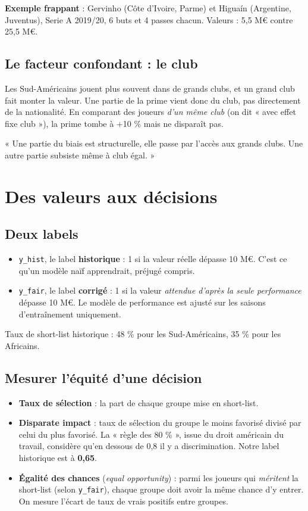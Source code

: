 \documentclass[11pt,a4paper]{article}
\begin{document}
\textbf{Exemple frappant} : Gervinho (Côte d'Ivoire, Parme) et Higuaín (Argentine, Juventus), Serie A 2019/20, 6 buts et 4 passes chacun. Valeurs : 5,5 M€ contre 25,5 M€.

\subsection{Le facteur confondant : le club}
Les Sud-Américains jouent plus souvent dans de grands clubs, et un grand club fait monter la valeur. Une partie de la prime vient donc du club, pas directement de la nationalité. En comparant des joueurs \emph{d'un même club} (on dit « avec effet fixe club »), la prime tombe à +10 \% mais ne disparaît pas.

\begin{oral}
« Une partie du biais est structurelle, elle passe par l'accès aux grands clubs. Une autre partie subsiste même à club égal. »
\end{oral}

\section{Des valeurs aux décisions}
\subsection{Deux labels}
\begin{itemize}
  \item \texttt{y\_hist}, le label \textbf{historique} : 1 si la valeur réelle dépasse 10 M€. C'est ce qu'un modèle naïf apprendrait, préjugé compris.
  \item \texttt{y\_fair}, le label \textbf{corrigé} : 1 si la valeur \emph{attendue d'après la seule performance} dépasse 10 M€. Le modèle de performance est ajusté sur les saisons d'entraînement uniquement.
\end{itemize}
Taux de short-list historique : 48 \% pour les Sud-Américains, 35 \% pour les Africains.

\subsection{Mesurer l'équité d'une décision}
\begin{itemize}
  \item \textbf{Taux de sélection} : la part de chaque groupe mise en short-list.
  \item \textbf{Disparate impact} : taux de sélection du groupe le moins favorisé divisé par celui du plus favorisé. La « règle des 80 \% », issue du droit américain du travail, considère qu'en dessous de 0,8 il y a discrimination. Notre label historique est à \textbf{0,65}.
  \item \textbf{Égalité des chances} (\emph{equal opportunity}) : parmi les joueurs qui \emph{méritent} la short-list (selon \texttt{y\_fair}), chaque groupe doit avoir la même chance d'y entrer. On mesure l'écart de taux de vrais positifs entre groupes.
\end{itemize}
\end{document}
